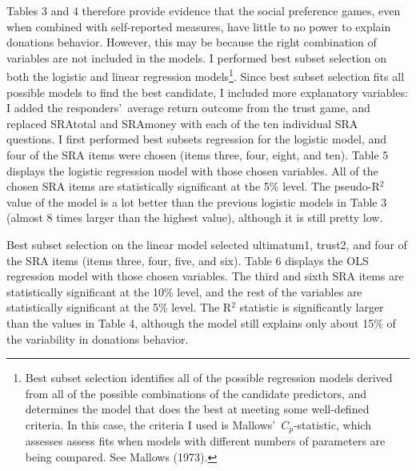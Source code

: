 \documentclass[12pt]{article}
\begin{document}
Tables 3 and 4 therefore provide evidence that the social preference games, even when combined with self-reported measures, have little to no power to explain donations behavior. However, this may be because the right combination of variables are not included in the models. I performed best subset selection on both the logistic and linear regression models\footnote{Best subset selection identifies all of the possible regression models derived from all of the possible combinations of the candidate predictors, and determines the model that does the best at meeting some well-defined criteria. In this case, the criteria I used is Mallows\rq \ \(C_{p}\)-statistic, which assesses assess fits when models with different numbers of parameters are being compared.  See Mallows (1973).}. Since best subset selection fits all possible models to find the best candidate, I included more explanatory variables: I added the responders\rq \ average return outcome from the trust game, and replaced SRAtotal and SRAmoney with each of the ten individual SRA questions. I first performed best subsets regression for the logistic model, and four of the SRA items were chosen (items three, four, eight, and ten). Table 5 displays the logistic regression model with those chosen variables. All of the chosen SRA items are statistically significant at the 5\% level. The pseudo-R$^{2}$ value of the model is a lot better than the previous logistic models in Table 3 (almost 8 times larger than the highest value), although it is still pretty low. 

Best subset selection on the linear model selected ultimatum1, trust2, and four of the SRA items (items three, four, five, and six). Table 6 displays the OLS regression model with those chosen variables. The third and sixth SRA items are statistically significant at the 10\% level, and the rest of the variables are statistically significant at the 5\% level. The R$^{2}$ statistic is significantly larger than the values in Table 4, although the model still explains only about 15\% of the variability in donations behavior.
\end{document}
